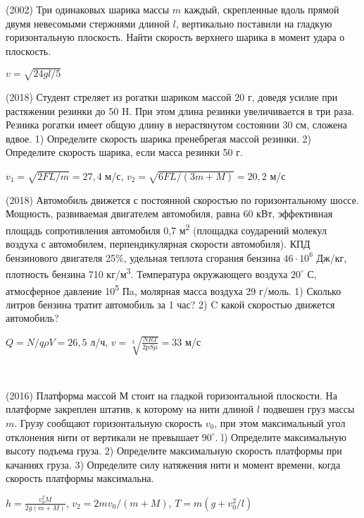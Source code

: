 \begin{ex}
(2002) Три одинаковых шарика массы $m$ каждый, скрепленные вдоль прямой двумя невесомыми стержнями длиной $l$, вертикально поставили на гладкую горизонтальную плоскость. Найти скорость верхнего шарика в момент удара о плоскость.
\begin{ans}
$v = \sqrt{24gl/5}$
\end{ans}
\end{ex}

\begin{ex}
(2018) Студент стреляет из рогатки шариком массой 20 г, доведя усилие при растяжении резинки до 50 H. При этом длина резинки увеличивается в три раза. Резника рогатки имеет общую длину в нерастянутом состоянии 30 см, сложена вдвое. 1) Определите скорость шарика пренебрегая массой резинки. 2) Определите скорость шарика, если масса резинки 50 г.
\begin{ans}
$v_1 = \sqrt{2FL/m}=27,4$ м/с, $v_2 = \sqrt{6FL/(3m+M)} = 20,2$ м/с
\end{ans}
\end{ex}

\begin{ex}
(2018) Автомобиль движется с постоянной скоростью по горизонтальному шоссе. Мощность, развиваемая двигателем
автомобиля, равна 60 кВт, эффективная площадь сопротивления автомобиля 0,7 м\textsuperscript{2} (площадка соударений молекул воздуха с автомобилем, перпендикулярная скорости автомобиля). КПД бензинового двигателя 25\%, удельная теплота сгорания бензина $46 \cdot 10^6$ Дж/кг, плотность бензина 710 кг/м\textsuperscript{3}. Температура окружающего воздуха $20^{\circ}$ С, атмосферное давление 10\textsuperscript{5} Пa, молярная масса воздуха 29 г/моль. 1) Сколько литров бензина тратит автомобиль за 1 час? 2) C какой скоростью движется автомобиль?
\begin{ans}
$Q = N/q \rho V = 26,5$ л/ч,  $v=\sqrt[3]{\frac{NRT}{2pS\mu}}=33$ м/с
\end{ans}
\end{ex}

\begin{ex}
\hspace{0pt} \\
\begin{minipage}{.65\textwidth}
(2016) Платформа массой $М$ стоит на гладкой горизонтальной плоскости. На платформе закреплен штатив, к которому на нити длиной $l$ подвешен груз массы $m$. Грузу сообщают горизонтальную скорость $v_0$, при этом максимальный угол отклонения нити от вертикали не превышает $90^{\circ}$. l) Определите максимальную высоту подъема груза. 2) Определите максимальную скорость платформы при качаниях груза. 3) Определите силу натяжения нити и момент времени, когда скорость платформы максимальна.
\end{minipage}
\begin{minipage}{.35\textwidth}
\centering

\end{minipage}
\begin{ans}
$h= \frac{v_0^2 M}{2g(m+M)}$, $v_2 = 2mv_0/(m+M)$, $T=m(g+v_0^2/l)$
\end{ans}
\end{ex}